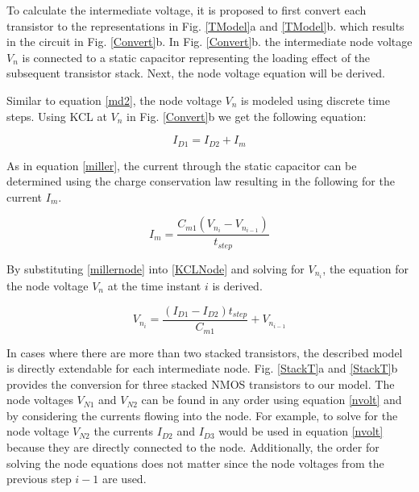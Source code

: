 To calculate the intermediate voltage, it is proposed to first convert each transistor to the representations in Fig. \ref{TModel}a and \ref{TModel}b. which results in the circuit in Fig. \ref{Convert}b. In Fig. \ref{Convert}b. the intermediate node voltage $V_n$ is connected to a static capacitor representing the loading effect of the subsequent transistor stack. Next, the node voltage equation will be derived.

Similar to equation \ref{md2}, the node voltage $V_n$ is modeled using discrete time steps. Using KCL at $V_n$ in Fig. \ref{Convert}b we get the following equation:

\begin{equation} \label{KCLNode}
I_{D1} = I_{D2} + I_m
\end{equation}

As in equation \ref{miller}, the current through the static capacitor can be determined using the charge conservation law resulting in the following for the current $I_m$.

\begin{equation} \label{millernode}
I_m = \frac{C_{m1}(V_{n_i} - V_{n_{i-1}})}{t_{step}}
\end{equation}

By substituting \ref{millernode} into \ref{KCLNode} and solving for $V_{n_i}$, the equation for the node voltage $V_n$ at the time instant $i$ is derived.

\begin{equation} \label{nvolt}
V_{n_i} = \frac{(I_{D1} - I_{D2})t_{step}}{C_{m1}} + V_{n_{i-1}}
\end{equation}

In cases where there are more than two stacked transistors, the described model is directly extendable for each intermediate node. Fig. \ref{StackT}a and \ref{StackT}b provides the conversion for three stacked NMOS transistors to our model. The node voltages $V_{N1}$ and $V_{N2}$ can be found in any order using equation \ref{nvolt} and by considering the currents flowing into the node. For example, to solve for the node voltage $V_{N2}$ the currents $I_{D2}$ and $I_{D3}$ would be used in equation \ref{nvolt} because they are directly connected to the node. Additionally, the order for solving the node equations does not matter since the node voltages from the previous step $i-1$ are used.

